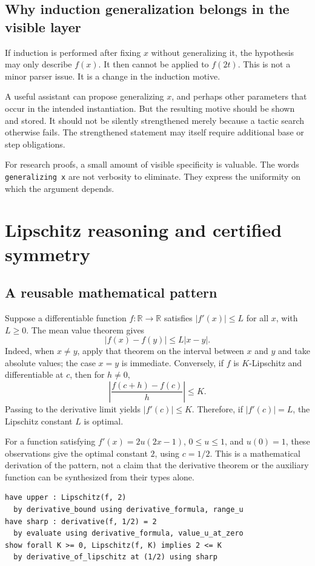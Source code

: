 \documentclass[11pt,a4paper]{article}
\newcommand{\code}[1]{\texttt{\small #1}}
\newcommand{\R}{\mathbb R}
\theoremstyle{definition}
\theoremstyle{remark}
\begin{document}
\subsection{Why induction generalization belongs in the visible layer}
If induction is performed after fixing $x$ without generalizing it, the hypothesis may only describe $f(x)$. It then cannot be applied to $f(2t)$. This is not a minor parser issue. It is a change in the induction motive.

A useful assistant can propose generalizing $x$, and perhaps other parameters that occur in the intended instantiation. But the resulting motive should be shown and stored. It should not be silently strengthened merely because a tactic search otherwise fails. The strengthened statement may itself require additional base or step obligations.

For research proofs, a small amount of visible specificity is valuable. The words \code{generalizing x} are not verbosity to eliminate. They express the uniformity on which the argument depends.

\section{Lipschitz reasoning and certified symmetry}
\label{sec:lipschitz}
\subsection{A reusable mathematical pattern}
Suppose a differentiable function $f:\R\to\R$ satisfies $|f'(x)|\le L$ for all $x$, with $L\ge0$. The mean value theorem gives
\[
 |f(x)-f(y)|\le L|x-y|.
\]
Indeed, when $x\ne y$, apply that theorem on the interval between $x$ and $y$ and take absolute values; the case $x=y$ is immediate. Conversely, if $f$ is $K$-Lipschitz and differentiable at $c$, then for $h\ne0$,
\[
 \left|\frac{f(c+h)-f(c)}h\right|\le K.
\]
Passing to the derivative limit yields $|f'(c)|\le K$. Therefore, if $|f'(c)|=L$, the Lipschitz constant $L$ is optimal.

For a function satisfying $f'(x)=2u(2x-1)$, $0\le u\le1$, and $u(0)=1$, these observations give the optimal constant $2$, using $c=1/2$. This is a mathematical derivation of the pattern, not a claim that the derivative theorem or the auxiliary function can be synthesized from their types alone.

\begin{lstlisting}
have upper : Lipschitz(f, 2)
  by derivative_bound using derivative_formula, range_u
have sharp : derivative(f, 1/2) = 2
  by evaluate using derivative_formula, value_u_at_zero
show forall K >= 0, Lipschitz(f, K) implies 2 <= K
  by derivative_of_lipschitz at (1/2) using sharp
\end{lstlisting}
\end{document}
